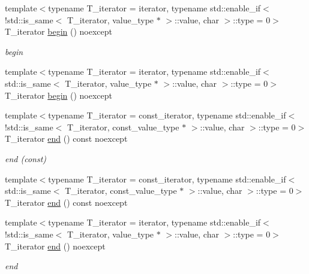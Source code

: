 \begin{DoxyCompactItemize}
{\footnotesize template$<$typename T\+\_\+iterator  = iterator, typename std\+::enable\+\_\+if$<$!std\+::is\+\_\+same$<$ T\+\_\+iterator, value\+\_\+type $\ast$ $>$\+::value, char $>$\+::type  = 0$>$ }\\T\+\_\+iterator \hyperlink{classIceBRG_1_1labeled__array__row__reference_a5fa54eb388d4240ce4700a20882c4616}{begin} () noexcept
\begin{DoxyCompactList}\small\item\em begin \end{DoxyCompactList}\item 
{\footnotesize template$<$typename T\+\_\+iterator  = iterator, typename std\+::enable\+\_\+if$<$ std\+::is\+\_\+same$<$ T\+\_\+iterator, value\+\_\+type $\ast$ $>$\+::value, char $>$\+::type  = 0$>$ }\\T\+\_\+iterator \hyperlink{classIceBRG_1_1labeled__array__row__reference_a5fa54eb388d4240ce4700a20882c4616}{begin} () noexcept
\item 
{\footnotesize template$<$typename T\+\_\+iterator  = const\+\_\+iterator, typename std\+::enable\+\_\+if$<$!std\+::is\+\_\+same$<$ T\+\_\+iterator, const\+\_\+value\+\_\+type $\ast$ $>$\+::value, char $>$\+::type  = 0$>$ }\\T\+\_\+iterator \hyperlink{classIceBRG_1_1labeled__array__row__reference_ad8387c725079b50f2364109245fec8c1}{end} () const  noexcept
\begin{DoxyCompactList}\small\item\em end (const) \end{DoxyCompactList}\item 
{\footnotesize template$<$typename T\+\_\+iterator  = const\+\_\+iterator, typename std\+::enable\+\_\+if$<$ std\+::is\+\_\+same$<$ T\+\_\+iterator, const\+\_\+value\+\_\+type $\ast$ $>$\+::value, char $>$\+::type  = 0$>$ }\\T\+\_\+iterator \hyperlink{classIceBRG_1_1labeled__array__row__reference_ad8387c725079b50f2364109245fec8c1}{end} () const  noexcept
\item 
{\footnotesize template$<$typename T\+\_\+iterator  = iterator, typename std\+::enable\+\_\+if$<$!std\+::is\+\_\+same$<$ T\+\_\+iterator, value\+\_\+type $\ast$ $>$\+::value, char $>$\+::type  = 0$>$ }\\T\+\_\+iterator \hyperlink{classIceBRG_1_1labeled__array__row__reference_a24df418e36063069ab29cd3a33e95154}{end} () noexcept
\begin{DoxyCompactList}\small\item\em end \end{DoxyCompactList}\item 

\end{DoxyCompactItemize}
